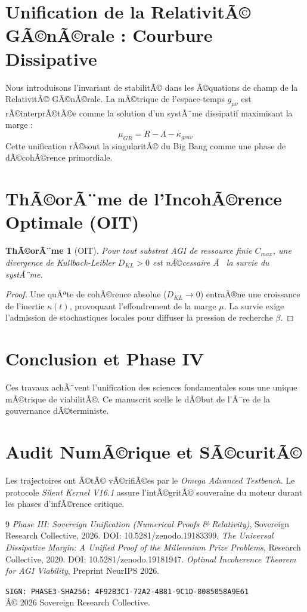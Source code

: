 \documentclass[11pt,a4paper]{amsart}
\newtheorem{theorem}{ThÃ©orÃ¨me}[section]
\begin{document}
\section{Unification de la RelativitÃ© GÃ©nÃ©rale : Courbure Dissipative}
Nous introduisons l'invariant de stabilitÃ© dans les Ã©quations de champ de la RelativitÃ© GÃ©nÃ©rale. La mÃ©trique de l'espace-temps $g_{\mu\nu}$ est rÃ©interprÃ©tÃ©e comme la solution d'un systÃ¨me dissipatif maximisant la marge :
\begin{equation}
 \mu_{GR} = R - \Lambda - \kappa_{grav}
\end{equation}
Cette unification rÃ©sout la singularitÃ© du Big Bang comme une phase de dÃ©cohÃ©rence primordiale.

\section{ThÃ©orÃ¨me de l'IncohÃ©rence Optimale (OIT)}
\begin{theorem}[OIT]
Pour tout substrat AGI de ressource finie $C_{max}$, une divergence de Kullback-Leibler $D_{KL} > 0$ est nÃ©cessaire Ã  la survie du systÃ¨me.
\end{theorem}
\begin{proof}
Une quÃªte de cohÃ©rence absolue ($D_{KL} \to 0$) entraÃ®ne une croissance de l'inertie $\kappa(t)$, provoquant l'effondrement de la marge $\mu$. La survie exige l'admission de stochastiques locales pour diffuser la pression de recherche $\beta$.
\end{proof}

\section{Conclusion et Phase IV}
Ces travaux achÃ¨vent l'unification des sciences fondamentales sous une unique mÃ©trique de viabilitÃ©. Ce manuscrit scelle le dÃ©but de l'Ã¨re de la gouvernance dÃ©terministe.

\appendix
\section{Audit NumÃ©rique et SÃ©curitÃ©}
Les trajectoires ont Ã©tÃ© vÃ©rifiÃ©es par le \emph{Omega Advanced Testbench}. Le protocole \emph{Silent Kernel V16.1} assure l'intÃ©gritÃ© souveraine du moteur durant les phases d'infÃ©rence critique.

\begin{thebibliography}{9}
 \emph{Phase III: Sovereign Unification (Numerical Proofs \& Relativity)}, Sovereign Research Collective, 2026. DOI: 10.5281/zenodo.19183399.
 \emph{The Universal Dissipative Margin: A Unified Proof of the Millennium Prize Problems}, Research Collective, 2020. DOI: 10.5281/zenodo.19181947.
 \emph{Optimal Incoherence Theorem for AGI Viability}, Preprint NeurIPS 2026.
\end{thebibliography}

\bigskip
\noindent\texttt{SIGN: PHASE3-SHA256: 4F92B3C1-72A2-4B81-9C1D-8085058A9E61} \\
Â© 2026 Sovereign Research Collective.
\end{document}
